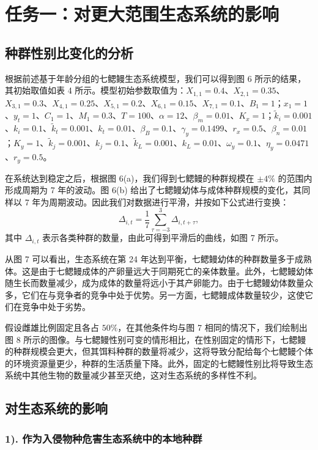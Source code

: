 \documentclass[11pt,a4paper]{ctexart}
\begin{document}
\section{任务一：对更大范围生态系统的影响}

\subsection{种群性别比变化的分析}

根据前述基于年龄分组的七鳃鳗生态系统模型，我们可以得到图 6 所示的结果，其初始取值如表 4 所示。模型初始参数取值为：$X_{1,1}=0.4$、$X_{2,1}=0.35$、$X_{3,1}=0.3$、$X_{4,1}=0.25$、$X_{5,1}=0.2$、$X_{6,1}=0.15$、$X_{7,1}=0.1$、$B_1=1$；$x_1=1$、$y_t=1$、$C_1=1$、$M_1=0.3$、$T=100$、$\alpha=12$、$\beta_m=0.01$、$K_x=1$；$\tilde{k}_i=0.001$、$k_i=0.1$、$\tilde{k}_t=0.001$、$k_t=0.01$、$\beta_B=0.1$、$\gamma_y=0.1499$、$r_x=0.5$、$\beta_n=0.01$；$K_y=1$、$\tilde{k}_j=0.001$、$k_j=0.1$、$\tilde{k}_L=0.001$、$k_L=0.01$、$\omega_y=0.1$、$\eta_y=0.0471$、$r_y=0.5$。

在系统达到稳定之后，根据图 6(a)，我们得到七鳃鳗的种群规模在 $\pm 4\%$ 的范围内形成周期为 7 年的波动。图 6(b) 给出了七鳃鳗幼体与成体种群规模的变化，其同样以 7 年为周期波动。因此我们对数据进行平滑，并按如下公式进行变换：
\begin{equation}
\Delta_{i,t}=\frac{1}{7}\sum_{\tau=-3}^{3}\Delta_{i,t+\tau},
\end{equation}
其中 $\Delta_{i,t}$ 表示各类种群的数量，由此可得到平滑后的曲线，如图 7 所示。

从图 7 可以看出，生态系统在第 24 年达到平衡，七鳃鳗幼体的种群数量多于成熟体。这是由于七鳃鳗成体的产卵量远大于同期死亡的亲体数量。此外，七鳃鳗幼体随生长而数量减少，成为成体的数量将远小于其产卵能力。由于七鳃鳗幼体数量众多，它们在与竞争者的竞争中处于优势。另一方面，七鳃鳗成体数量较少，这使它们在竞争中处于劣势。

假设雌雄比例固定且各占 $50\%$，在其他条件均与图 7 相同的情况下，我们绘制出图 8 所示的图像。与七鳃鳗性别可变的情形相比，在性别固定的情形下，七鳃鳗的种群规模会更大，但其饵料种群的数量将减少，这将导致分配给每个七鳃鳗个体的环境资源量更少，种群的生活质量下降。此外，固定的七鳃鳗性别比将导致生态系统中其他生物的数量减少甚至灭绝，这对生态系统的多样性不利。

\subsection{对生态系统的影响}

\subsubsection*{1). 作为入侵物种危害生态系统中的本地种群}
\end{document}
